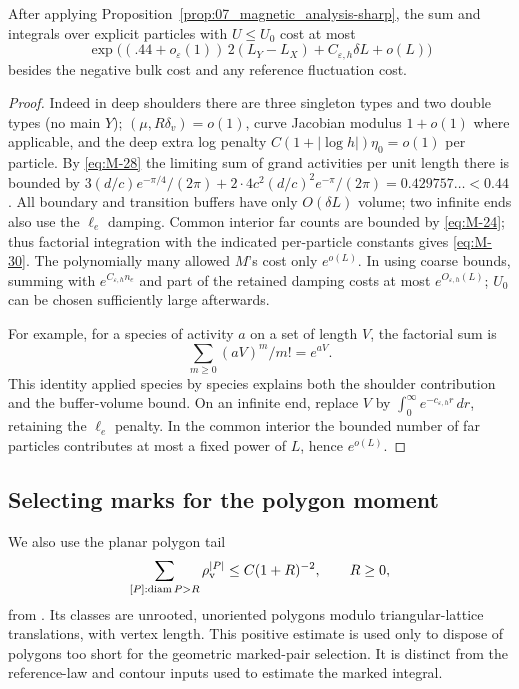 \begin{corollary}\label{cor:07_magnetic_analysis-activities}
After applying Proposition~\ref{prop:07_magnetic_analysis-sharp}, the sum and integrals over explicit particles with \(U\le U_0\) cost at most
\begin{equation}
 \exp\big((.44+o_\varepsilon(1))\,2(L_Y-L_X)
       +C_{\varepsilon,h}\delta L+o(L)\big)
 \label{eq:M-30}
\end{equation}
besides the negative bulk cost and any reference fluctuation cost. 
\end{corollary}
\begin{proof}
Indeed in deep shoulders there are three singleton types and two double types (no main \(Y\)); \((\mu,R\delta_v)=o(1)\), curve Jacobian modulus \(1+o(1)\) where applicable, and the deep extra log penalty \(C(1+|\log h|)\eta_0=o(1)\) per particle. By \eqref{eq:M-28} the limiting sum of grand activities per unit length there is bounded by
\(3(d/c)e^{-\pi/4}/(2\pi)+2\cdot4c^2(d/c)^2 e^{-\pi}/(2\pi)=0.429757\ldots<0.44\).
All boundary and transition buffers have only \(O(\delta L)\) volume; two infinite ends also use the \(\ell_e\) damping. Common interior far counts are bounded by \eqref{eq:M-24}; thus factorial integration with the indicated per-particle constants gives \eqref{eq:M-30}. The polynomially many allowed \(M\)'s cost only \(e^{o(L)}\). In using coarse bounds, summing with \(e^{C_{\varepsilon,h} n_e}\) and part of the retained damping costs at most \(e^{O_{\varepsilon,h}(L)}\); \(U_0\) can be chosen sufficiently large afterwards.


For example, for a species of activity \(a\) on a set of length \(V\),
the factorial sum is
\[\sum_{m\ge0}(aV)^m/m!=e^{aV}.\] This identity applied species by
species explains both the shoulder contribution and the buffer-volume
bound. On an infinite end, replace \(V\) by
\(\int_0^\infty e^{-c_{\varepsilon,h}r}\,dr\), retaining the
\(\ell_e\) penalty. In the common interior the bounded number of far
particles contributes at most a fixed power of \(L\), hence \(e^{o(L)}\).

\end{proof}

\subsection{Selecting marks for the polygon moment}

We also use the planar polygon tail
\begin{equation}\label{eq:planar-tail}
 \sum_{[P]:\operatorname{diam}P>R}\rho_{\rm v}^{|P|}
       \le C(1+R)^{-2},\qquad R\ge0,
\end{equation}
from \cite[Theorem~10.5]{Electric}. Its classes are unrooted,
unoriented polygons modulo triangular-lattice translations, with
vertex length. This positive estimate is used only to dispose of
polygons too short for the geometric marked-pair selection. It is
distinct from the reference-law and contour inputs used to estimate the marked integral.

